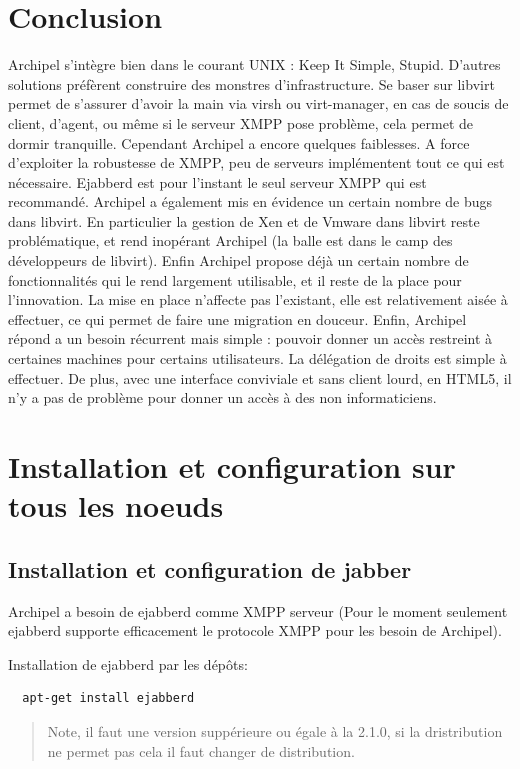     \section{Conclusion}
Archipel s'intègre bien dans le courant UNIX : Keep It Simple, Stupid. D'autres solutions préfèrent
construire des monstres d'infrastructure. Se baser sur libvirt permet de s'assurer d'avoir la main via virsh
ou virt-manager, en cas de soucis de client, d'agent, ou même si le serveur XMPP pose problème, cela
permet de dormir tranquille.\newline
Cependant Archipel a encore quelques faiblesses. A force d'exploiter la robustesse de XMPP, peu de
serveurs implémentent tout ce qui est nécessaire. Ejabberd est pour l'instant le seul serveur XMPP qui est
recommandé. Archipel a également mis en évidence un certain nombre de bugs dans libvirt. En particulier
la gestion de Xen et de Vmware dans libvirt reste problématique, et rend inopérant Archipel (la balle est
dans le camp des développeurs de libvirt). Enfin Archipel propose déjà un certain nombre de
fonctionnalités qui le rend largement utilisable, et il reste de la place pour l'innovation.\newline
La mise en place n'affecte pas l'existant, elle est relativement aisée à effectuer, ce qui permet de faire
une migration en douceur.\newline
Enfin, Archipel répond a un besoin récurrent mais simple : pouvoir donner un accès restreint à certaines
machines pour certains utilisateurs. La délégation de droits est simple à effectuer. De plus, avec une
interface conviviale et sans client lourd, en HTML5, il n'y a pas de problème pour donner un accès à des
non informaticiens.

    \section{Installation et configuration sur tous les noeuds}
	\subsection{Installation et configuration de jabber}
Archipel a besoin de ejabberd comme XMPP serveur (Pour le moment seulement ejabberd supporte efficacement le protocole XMPP pour les
besoin de Archipel). 

Installation de ejabberd par les dépôts:
\begin{lstlisting}
  apt-get install ejabberd
\end{lstlisting}
\begin{quotation}
Note, il faut une version suppérieure ou égale à la 2.1.0, si la dristribution ne permet pas cela il faut changer de distribution.
\end{quotation}

